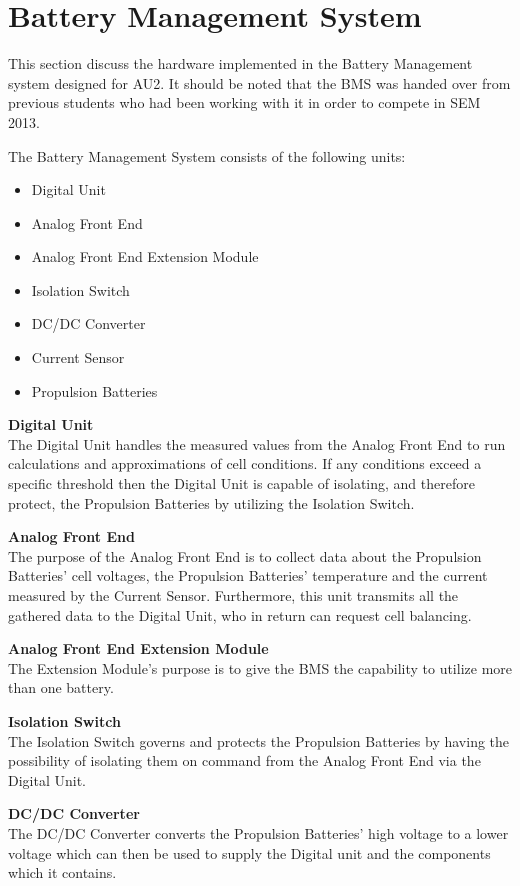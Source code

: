 \section{Battery Management System}
This section discuss the hardware implemented in the Battery Management system designed for AU2. It should be noted that the BMS was handed over from previous students who had been working with it in order to compete in SEM 2013.

The Battery Management System consists of the following units:
\begin{itemize}
	\item{Digital Unit}
	\item{Analog Front End}
	\item{Analog Front End Extension Module}
	\item{Isolation Switch}
	\item{DC/DC Converter}
	\item{Current Sensor}
	\item{Propulsion Batteries}
\end{itemize}

\textbf{Digital Unit}\\
The Digital Unit handles the measured values from the Analog Front End to run calculations and approximations of cell conditions. If any conditions exceed a specific threshold then the Digital Unit is capable of isolating, and therefore protect, the Propulsion Batteries by utilizing the Isolation Switch.

\textbf{Analog Front End}\\
The purpose of the Analog Front End is to collect data about the Propulsion Batteries' cell voltages, the Propulsion Batteries' temperature and the current measured by the Current Sensor. Furthermore, this unit transmits all the gathered data to the Digital Unit, who in return can request cell balancing. 

\textbf{Analog Front End Extension Module}\\
The Extension Module's purpose is to give the BMS the capability to utilize more than one battery.

\textbf{Isolation Switch}\\
The Isolation Switch governs and protects the Propulsion Batteries by having the possibility of isolating them on command from the Analog Front End via the Digital Unit. 

\textbf{DC/DC Converter}\\
The DC/DC Converter converts the Propulsion Batteries' high voltage to a lower voltage which can then be used to supply the Digital unit and the components which it contains.

